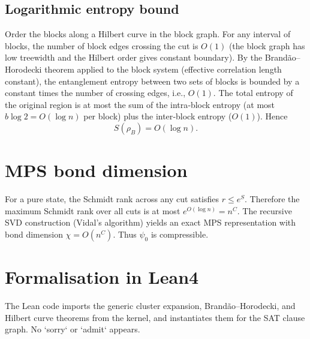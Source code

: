 \documentclass[11pt,a4paper]{article}
\begin{document}
\subsection{Logarithmic entropy bound}
Order the blocks along a Hilbert curve in the block graph. For any interval of blocks, the number of block edges crossing the cut is \(O(1)\) (the block graph has low treewidth and the Hilbert order gives constant boundary). By the Brandão–Horodecki theorem applied to the block system (effective correlation length constant), the entanglement entropy between two sets of blocks is bounded by a constant times the number of crossing edges, i.e., \(O(1)\). The total entropy of the original region is at most the sum of the intra‑block entropy (at most \(b\log 2 = O(\log n)\) per block) plus the inter‑block entropy (\(O(1)\)). Hence
\[
S(\rho_B) = O(\log n).
\]

\section{MPS bond dimension}

For a pure state, the Schmidt rank across any cut satisfies \(r \le e^{S}\). Therefore the maximum Schmidt rank over all cuts is at most \(e^{O(\log n)} = n^{C}\). The recursive SVD construction (Vidal's algorithm) yields an exact MPS representation with bond dimension \(\chi = O(n^{C})\). Thus \(\psi_0\) is compressible.

\section{Formalisation in Lean4}

The Lean code imports the generic cluster expansion, Brandão–Horodecki, and Hilbert curve theorems from the kernel, and instantiates them for the SAT clause graph. No `sorry` or `admit` appears.
\end{document}
